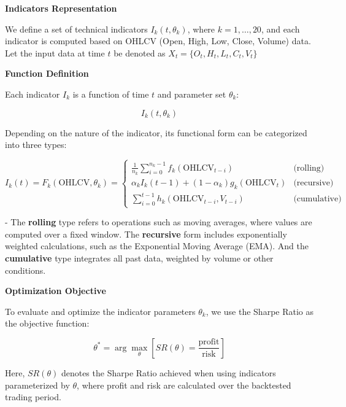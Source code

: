 \textbf{Indicators Representation}

We define a set of technical indicators \( I_k(t, \theta_k) \), where \( k = 1, \ldots, 20 \), and each indicator is computed based on OHLCV (Open, High, Low, Close, Volume) data. Let the input data at time \( t \) be denoted as \( X_t = \{O_t, H_t, L_t, C_t, V_t\} \)

\textbf{Function Definition}

Each indicator \( I_k \) is a function of time \( t \) and parameter set \( \theta_k \):

\begin{equation}
I_k(t, \theta_k)
\label{eq_indicator_definition}
\end{equation}

Depending on the nature of the indicator, its functional form can be categorized into three types:

\begin{equation}
I_k(t) = F_k(\text{OHLCV}, \theta_k) = 
\begin{cases}
\frac{1}{n_k} \sum\limits_{i=0}^{n_k-1} f_k(\text{OHLCV}_{t-i}) & \text{(rolling)} \\
\alpha_k I_k(t-1) + (1 - \alpha_k) g_k(\text{OHLCV}_t) & \text{(recursive)} \\
\sum\limits_{i=0}^{t-1} h_k(\text{OHLCV}_{t-i}, V_{t-i}) & \text{(cumulative)}
\end{cases}
\label{eq_indicator_types}
\end{equation}

- The \textbf{rolling} type refers to operations such as moving averages, where values are computed over a fixed window. The \textbf{recursive} form includes exponentially weighted calculations, such as the Exponential Moving Average (EMA). And the \textbf{cumulative} type integrates all past data, weighted by volume or other conditions.

\textbf{Optimization Objective}

To evaluate and optimize the indicator parameters \( \theta_k \), we use the Sharpe Ratio as the objective function:

\begin{equation}
\theta^* = \arg\max_\theta \left[ SR(\theta) = \frac{\text{profit}}{\text{risk}} \right]
\label{eq_optimization_objective}
\end{equation}

Here, \( SR(\theta) \) denotes the Sharpe Ratio achieved when using indicators parameterized by \( \theta \), where profit and risk are calculated over the backtested trading period.

